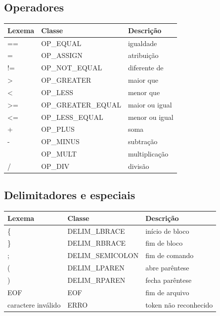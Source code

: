 \documentclass[12pt,a4paper]{article}
\begin{document}
\subsection{Operadores}
\begin{longtable}{>{\raggedright\arraybackslash\ttfamily}p{1.8cm} >{\raggedright\arraybackslash\ttfamily}p{4.8cm} >{\raggedright\arraybackslash}p{5.8cm}}
\toprule
\textnormal{Lexema} & \textnormal{Classe} & \textnormal{Descrição} \\
\midrule
\endhead
== & OP\_EQUAL & igualdade \\
= & OP\_ASSIGN & atribuição \\
!= & OP\_NOT\_EQUAL & diferente de \\
> & OP\_GREATER & maior que \\
< & OP\_LESS & menor que \\
>= & OP\_GREATER\_EQUAL & maior ou igual \\
<= & OP\_LESS\_EQUAL & menor ou igual \\
+ & OP\_PLUS & soma \\
- & OP\_MINUS & subtração \\
* & OP\_MULT & multiplicação \\
/ & OP\_DIV & divisão \\
\bottomrule
\end{longtable}

\subsection{Delimitadores e especiais}
\begin{longtable}{>{\raggedright\arraybackslash\ttfamily}p{1.8cm} >{\raggedright\arraybackslash\ttfamily}p{4.8cm} >{\raggedright\arraybackslash}p{5.8cm}}
\toprule
\textnormal{Lexema} & \textnormal{Classe} & \textnormal{Descrição} \\
\midrule
\endhead
\{ & DELIM\_LBRACE & início de bloco \\
\} & DELIM\_RBRACE & fim de bloco \\
; & DELIM\_SEMICOLON & fim de comando \\
( & DELIM\_LPAREN & abre parêntese \\
) & DELIM\_RPAREN & fecha parêntese \\
EOF & EOF & fim de arquivo \\
caractere inválido & ERRO & token não reconhecido \\
\bottomrule
\end{longtable}
\end{document}
